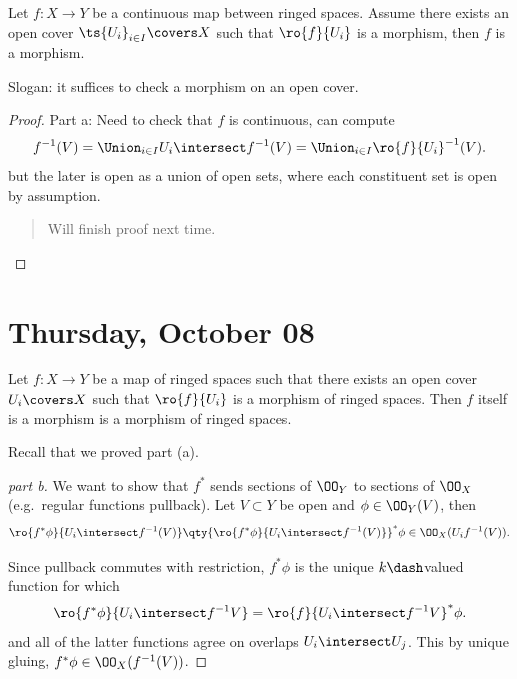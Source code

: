\begin{lemma}

Let \(f:X\to Y\) be a continuous map between ringed spaces. Assume there
exists an open cover \(\ts{U_i}_{i\in I}\covers X\) such that
\(\ro{f}{U_i}\) is a morphism, then \(f\) is a morphism.

Slogan: it suffices to check a morphism on an open cover.

\end{lemma}

\begin{proof}

Part a: Need to check that \(f\) is continuous, can compute
\begin{align*}  
f^{-1}(V) = \Union_{i\in I} U_i \intersect f^{-1}(V) = \Union_{i\in I} \ro{f}{U_i}^{-1} (V)
.\end{align*} but the later is open as a union of open sets, where each
constituent set is open by assumption.

\begin{quote}
Will finish proof next time.
\end{quote}

\end{proof}

\hypertarget{thursday-october-08}{%
\section{Thursday, October 08}\label{thursday-october-08}}

\begin{proposition}[Gluing]

Let \(f:X\to Y\) be a map of ringed spaces such that there exists an
open cover \(U_i\covers X\) such that \(\ro{f}{U_i}\) is a morphism of
ringed spaces. Then \(f\) itself is a morphism is a morphism of ringed
spaces.

\end{proposition}

Recall that we proved part (a).

\begin{proof}[part b]

We want to show that \(f^*\) sends sections of \(\OO_Y\) to sections of
\(\OO_X\) (e.g.~regular functions pullback). Let \(V\subset Y\) be open
and \(\phi \in \OO_Y(V)\), then
\begin{align*}  
\ro{f^* \phi}{U_i \intersect f^{-1} (V)}
\qty{ \ro{f^* \phi}{U_i \intersect f^{-1} (V)} }^* \phi \in 
\OO_X(U_i f^{-1} (V))
.\end{align*}

Since pullback commutes with restriction, \(f^* \phi\) is the unique
\(k\dash\)valued function for which
\begin{align*}  
\ro{f^* \phi}{U_i \intersect f^{-1} V} =
\ro{f}{U_i\intersect f^{-1} V}^* \phi
.\end{align*} and all of the latter functions agree on overlaps
\(U_i \intersect U_j\). This by unique gluing,
\(f^* \phi \in \OO_X(f^{-1}(V))\).

\end{proof}

